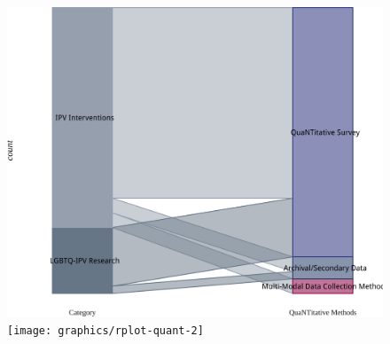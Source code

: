 \documentclass[]{tufte-handout}
\begin{document}
\begin{figure}
\includegraphics[width=\linewidth]{graphics/rplot-quant-1} \texttt{[image: graphics/rplot-quant-2]} \end{figure}

\newpage

\end{document}
